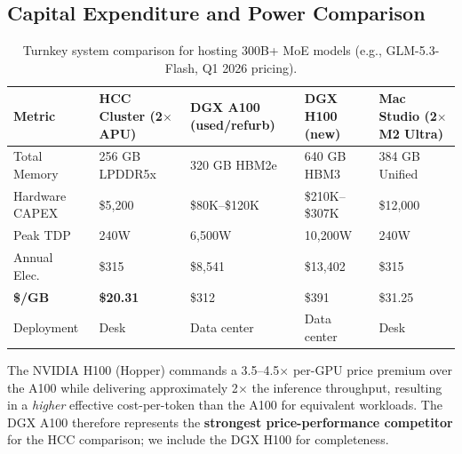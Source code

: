 \documentclass[11pt,a4paper]{article}
\begin{document}
\subsection{Capital Expenditure and Power Comparison}

\begin{table}[ht!]
\centering
\caption{Turnkey system comparison for hosting 300B+ MoE models (e.g., GLM-5.3-Flash, Q1 2026 pricing).\protect\footnotemark}
\vspace{0.2cm}
\begin{tabular}{p{2.5cm} p{2.5cm} p{2.5cm} p{2.5cm} p{2.5cm}}
\toprule
\textbf{Metric} & \textbf{HCC Cluster} \newline (2$\times$ APU) & \textbf{DGX A100} \newline (used/refurb) & \textbf{DGX H100} \newline (new) & \textbf{Mac Studio} \newline (2$\times$ M2 Ultra) \\
\midrule
Total Memory & 256 GB LPDDR5x & 320 GB HBM2e & 640 GB HBM3 & 384 GB Unified \\
Hardware CAPEX & \$5,200 & \$80K--\$120K & \$210K--\$307K & \$12,000 \\
Peak TDP & 240W & 6,500W & 10,200W & 240W \\
Annual Elec.\ & \$315 & \$8,541 & \$13,402 & \$315 \\
\textbf{\$/GB} & \textbf{\$20.31} & \$312 & \$391 & \$31.25 \\
Deployment & Desk & Data center & Data center & Desk \\
\bottomrule
\end{tabular}
\label{tab:tco_table}
\end{table}

\noindent The NVIDIA H100 (Hopper) commands a 3.5--4.5$\times$ per-GPU price premium over the A100 while delivering approximately 2$\times$ the inference throughput, resulting in a \textit{higher} effective cost-per-token than the A100 for equivalent workloads. The DGX A100 therefore represents the \textbf{strongest price-performance competitor} for the HCC comparison; we include the DGX H100 for completeness.
\end{document}
